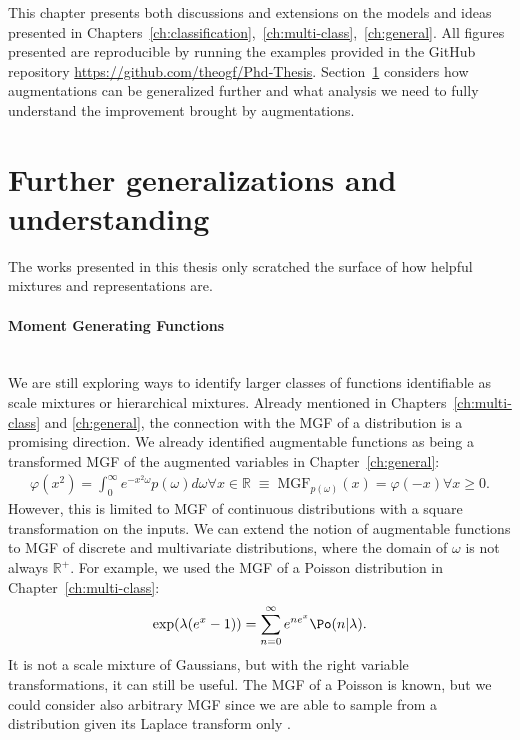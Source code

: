 

\graphicspath{{8/figures/}}
This chapter presents both discussions and extensions on the models and ideas presented in Chapters~\ref{ch:classification},~\ref{ch:multi-class},~\ref{ch:general}.
All figures presented are reproducible by running the examples provided in the GitHub repository \url{https://github.com/theogf/Phd-Thesis}.
Section~\ref{sec:further} considers how augmentations can be generalized further and what analysis we need to fully understand the improvement brought by augmentations.

\section{Further generalizations and understanding}
\label{sec:further}
The works presented in this thesis only scratched the surface of how helpful mixtures and representations are.
\paragraph{Moment Generating Functions}\mbox{}\\
We are still exploring ways to identify larger classes of functions identifiable as scale mixtures or hierarchical mixtures.
Already mentioned in Chapters~\ref{ch:multi-class} and \ref{ch:general},
the connection with the \acf{MGF} of a distribution is a promising direction.
We already identified augmentable functions as being a transformed \ac{MGF} of the augmented variables in Chapter~\ref{ch:general}:
\begin{align*}
    \varphi(x^2) = \int_0^\infty e^{-x^2\omega}p(\omega)d\omega \forall x \in \mathbb{R} \;\equiv\; \mathrm{MGF}_{p(\omega)}(x) = \varphi(-x) \forall x \geq 0.
\end{align*}
However, this is limited to \ac{MGF} of continuous distributions with a square transformation on the inputs.
We can extend the notion of augmentable functions to \ac{MGF} of discrete and multivariate distributions, where the domain of $\omega$ is not always $\mathbb{R}^+$.
For example, we used the \ac{MGF} of a Poisson distribution in Chapter~\ref{ch:multi-class}:
\begin{align*}
    \exp(\lambda(e^x - 1)) = \sum_{n=0}^\infty e^{n e^x} \Po(n|\lambda).
\end{align*}
It is not a scale mixture of Gaussians, but with the right variable transformations, it can still be useful.
The \ac{MGF} of a Poisson is known, but we could consider also arbitrary \ac{MGF} since we are able to sample from a distribution given its Laplace transform only \cite{ridout2009generating}.


